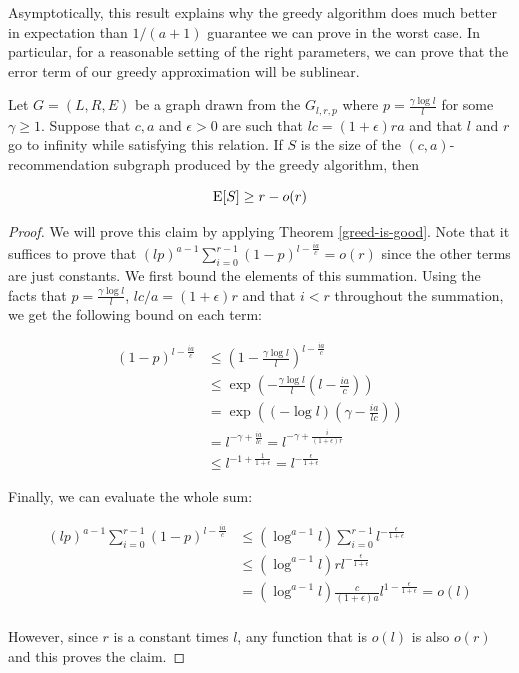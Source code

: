 Asymptotically, this result explains why the greedy
algorithm does much better in expectation than $1/(a+1)$ guarantee we
can prove in the worst case. In particular, for a reasonable setting of
the right parameters, we can prove that the error term of our greedy
approximation will be sublinear.

\begin{thm}
\label{simple-thm}
Let $G=(L,R,E)$ be a graph drawn from the $G_{l,r,p}$ where $p = \frac{\gamma \log l}{l}$ for some $\gamma \geq 1$. Suppose that $c, a$ and $\epsilon>0$ are such that $lc=(1+\epsilon)ra$ and that $l$ and $r$ go to infinity while satisfying this relation. If $S$ is the size of the $(c,a)$-recommendation subgraph produced by the greedy algorithm, then

\[ \text{E}[S] \geq r - o(r) \]
\end{thm}
\begin{proof}
We will prove this claim by applying Theorem \ref{greed-is-good}. Note that it suffices to prove that $(lp)^{a-1}\sum_{i=0}^{r-1}(1-p)^{l-\frac{ia}{c}} = o(r)$ since the other terms are just constants. We first bound the elements of this summation. Using the facts that $p = \frac{\gamma \log l}{l}$, $lc/a = (1+\epsilon)r$ and that $i<r$ throughout the summation, we get the following bound on each term:

\begin{align*}
       (1-p)^{l-\frac{ia}{c}}
&\leq  \left(1-\frac{\gamma \log l}{l}\right)^{l-\frac{ia}{c}} \\
&\leq  \exp\left(-\frac{\gamma \log l}{l}\left(l-\frac{ia}{c}\right)\right) \\
&=     \exp\left((-\log l)\left(\gamma - \frac{ia}{lc}\right)\right) \\
&=     l^{-\gamma+\frac{ia}{lc}} = l^{-\gamma+\frac{i}{(1+\epsilon)r}} \\
&\leq  l^{-1+\frac{1}{1+\epsilon}} = l^{-\frac{\epsilon}{1+\epsilon}}
\end{align*}

Finally, we can evaluate the whole sum:

\begin{align*}
       (lp)^{a-1}  \sum_{i=0}^{r-1}(1-p)^{l-\frac{ia}{c}}
&\leq  \left(\log^{a-1}l\right) \sum_{i=0}^{r-1}l^{-\frac{\epsilon}{1+\epsilon}}\\
&\leq  \left(\log^{a-1}l\right) rl^{-\frac{\epsilon}{1+\epsilon}}\\
&=     \left(\log^{a-1}l\right) \frac{c}{(1+\epsilon)a}l^{1-\frac{\epsilon}{1+\epsilon}} = o(l)\\
\end{align*}

However, since $r$ is a constant times $l$, any function that is $o(l)$ is also $o(r)$ and this proves the claim.

\end{proof}









